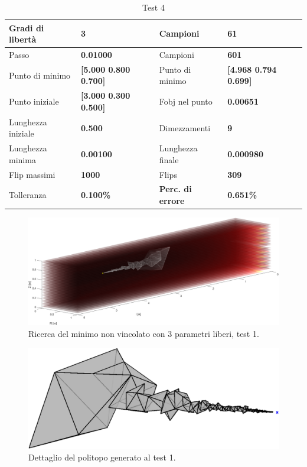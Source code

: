 \documentclass[a4paper, 11pt]{article}
\begin{document}
\begin{table}[h] 
	\caption{Test 4}
	\begin{center}
	\begin{tabular}{|l|l|l|l|} 
	\hline 
	Gradi di libertà & \textbf{3} & Campioni & \textbf{61} \\ \hline 
	Passo & \textbf{0.01000} & Campioni & \textbf{601} \\ \hline 
	Punto di minimo & \textbf{{[}5.000 0.800 0.700{]}} & Punto di minimo & \textbf{{[}4.968 0.794 0.699{]}} \\ \hline 
	Punto iniziale & \textbf{{[}3.000 0.300 0.500{]}} & Fobj nel punto & \textbf{0.00651} \\ \hline 
	Lunghezza iniziale & \textbf{0.500} & Dimezzamenti & \textbf{9} \\ \hline 
	Lunghezza minima & \textbf{0.00100} & Lunghezza finale & \textbf{0.000980} \\ \hline
	Flip massimi & \textbf{1000} & Flips & \textbf{309} \\ \hline 
	Tolleranza & \textbf{0.100\%} & \textbf{Perc. di errore} & \textbf{0.651\%} \\ \hline 
	\end{tabular}
	\end{center}
	\end{table}

\begin{figure}[H]
	\centering
		\includegraphics[width=16cm]{assets/figure4}
		\caption{Ricerca del minimo non vincolato con 3 parametri liberi, test 1.}
\end{figure}
\noindent 

\begin{figure}[H]
	\centering
		\includegraphics[width=14cm]{assets/figure5}
		\caption{Dettaglio del politopo generato al test 1.}
\end{figure}
\noindent 
\end{document}
